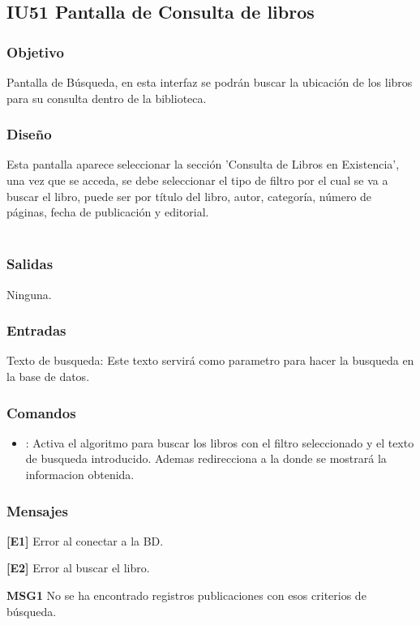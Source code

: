 \newpage
\subsection{IU51 Pantalla de Consulta de libros}

\subsubsection{Objetivo}
	Pantalla de Búsqueda, en esta interfaz se podrán buscar la ubicación de los libros para su consulta dentro de la biblioteca. 

\subsubsection{Diseño}
	Esta pantalla aparece seleccionar la sección 'Consulta de Libros en Existencia', una vez que se acceda, se debe seleccionar el tipo de filtro por el cual se va a buscar el libro, puede ser por título del libro, autor, categoría, número de páginas, fecha de publicación y editorial.   \\\\
	


\subsubsection{Salidas}
	\begin{Citemize}
		\item Ninguna. 
	\end{Citemize}
	
\subsubsection{Entradas}
	\begin{Citemize}
		\item Texto de busqueda: Este texto servirá como parametro para hacer la busqueda en la base de datos.
	\end{Citemize}

\subsubsection{Comandos}
\begin{itemize}
	\item {}: Activa el algoritmo para buscar los libros con el filtro seleccionado y el texto de busqueda introducido. Ademas redirecciona a la  donde se mostrará la informacion obtenida.
\end{itemize}

\subsubsection{Mensajes}
	\begin{Citemize}
		\item {\bf [E1]} Error al conectar a la BD.
		\item {\bf [E2]} Error al buscar el libro.
		\item {\bf MSG1} No se ha encontrado registros publicaciones con esos criterios de búsqueda. 
	\end{Citemize}